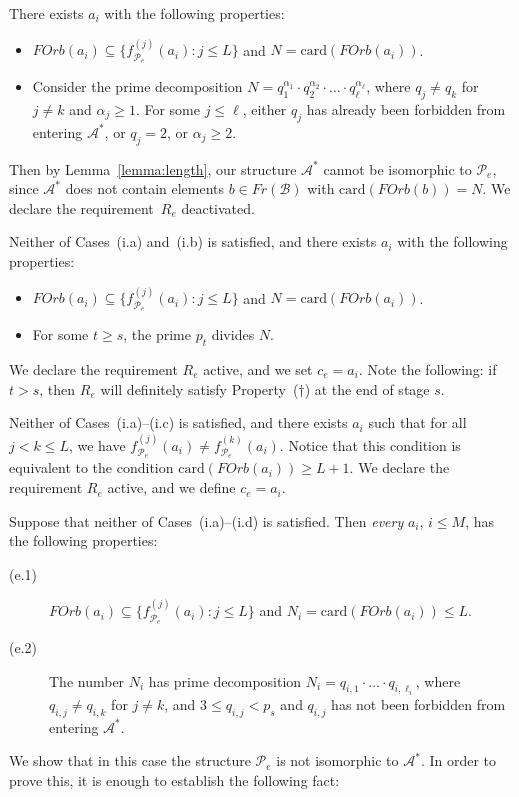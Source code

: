 \documentclass[a4paper,UKenglish,cleveref, autoref, thm-restate]{lipics-v2021}
\begin{document}
 There exists $a_i$ with the following properties:
\begin{itemize}
	\item $FOrb(a_i) \subseteq \{ f_{\mathcal{P}_e}^{(j)}(a_i) : j\leq L\}$ and $N = \mathrm{card}(FOrb(a_i))$.

	\item Consider the prime decomposition $N = q_1^{\alpha_1} \cdot q_2^{\alpha_2} \cdot \ldots \cdot q_{\ell}^{\alpha_\ell}$, where $q_j \neq q_k$ for $j\neq k$ and $\alpha_j \geq 1$. For some $j\leq \ell$, either $q_j$ has already been forbidden from entering $\mathcal{A}^{\ast}$, or $q_j = 2$, or $\alpha_j \geq 2$.
\end{itemize}
Then by Lemma~\ref{lemma:length}, our structure $\mathcal{A}^{\ast}$ cannot be isomorphic to $\mathcal{P}_e$, since $\mathcal{A}^{\ast}$ does not contain elements $b\in Fr(\mathcal{B})$ with $\mathrm{card}(FOrb(b)) = N$. 
We declare the requirement~$R_e$ deactivated.



 Neither of Cases~(i.a) and~(i.b) is satisfied, and there exists $a_i$ with the following properties:
\begin{itemize}
	\item $FOrb(a_i) \subseteq \{ f_{\mathcal{P}_e}^{(j)}(a_i) : j\leq L\}$ and $N = \mathrm{card}(FOrb(a_i))$.

	\item For some $t\geq s$, the prime $p_t$ divides $N$.
\end{itemize}
We declare the requirement $R_e$ active, and we set $c_e = a_i$. Note the following: if $t>s$, then $R_e$ will definitely satisfy Property~($\dagger$) at the end of stage $s$. 



 Neither of Cases~(i.a)--(i.c) is satisfied, and there exists $a_i$ such that for all $j < k\leq L$, we have $f_{\mathcal{P}_e}^{(j)}(a_i) \neq f_{\mathcal{P}_e}^{(k)}(a_i)$. Notice that this condition is equivalent to the condition $\mathrm{card}(FOrb(a_i)) \geq L+1$. 
We declare the requirement $R_e$ active, and we define $c_e = a_i$.



 Suppose that neither of Cases~(i.a)--(i.d) is satisfied. Then \emph{every} $a_i$, $i\leq M$, has the following properties:
\begin{description}
	\item[(e.1)] $FOrb(a_i) \subseteq \{ f_{\mathcal{P}_e}^{(j)}(a_i) : j\leq L\}$ and $N_i = \mathrm{card}(FOrb(a_i)) \leq L$. 
	
	\item[(e.2)] The number $N_i$ has prime decomposition $N_i = q_{i,1} \cdot \ldots\cdot q_{i,\ell_i}$, where $q_{i,j} \neq q_{i,k}$ for $j\neq k$, and $3\leq q_{i,j} < p_{s}$ and $q_{i,j}$ has not been forbidden from entering $\mathcal{A}^{\ast}$.
\end{description}
We show that in this case the structure $\mathcal{P}_e$ is not isomorphic to $\mathcal{A}^{\ast}$. 
In order to prove this, it is enough to establish the following fact: 
\end{document}
